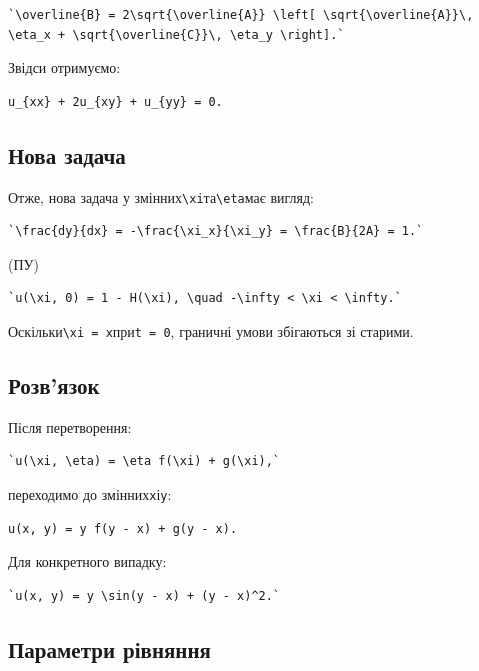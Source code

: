 \documentclass[
  ukrainian,
]{article}
\begin{document}
\begin{verbatim}
`\overline{B} = 2\sqrt{\overline{A}} \left[ \sqrt{\overline{A}}\, \eta_x + \sqrt{\overline{C}}\, \eta_y \right].`
\end{verbatim}

Звідси отримуємо:

\begin{verbatim}
u_{xx} + 2u_{xy} + u_{yy} = 0.
\end{verbatim}

\subsection{Нова
задача}\label{ux43dux43eux432ux430-ux437ux430ux434ux430ux447ux430}

Отже, нова задача у
змінних\texttt{\textbackslash{}xi}та\texttt{\textbackslash{}eta}має
вигляд:

\begin{verbatim}
`\frac{dy}{dx} = -\frac{\xi_x}{\xi_y} = \frac{B}{2A} = 1.`
\end{verbatim}

(ПУ)

\begin{verbatim}
`u(\xi, 0) = 1 - H(\xi), \quad -\infty < \xi < \infty.`
\end{verbatim}

Оскільки\texttt{\textbackslash{}xi\ =\ x}при\texttt{t\ =\ 0}, граничні
умови збігаються зі старими.

\subsection{Розв'язок}\label{ux440ux43eux437ux432ux44fux437ux43eux43a}

Після перетворення:

\begin{verbatim}
`u(\xi, \eta) = \eta f(\xi) + g(\xi),`
\end{verbatim}

переходимо до змінних\texttt{x}і\texttt{y}:

\begin{verbatim}
u(x, y) = y f(y - x) + g(y - x).
\end{verbatim}

Для конкретного випадку:

\begin{verbatim}
`u(x, y) = y \sin(y - x) + (y - x)^2.`
\end{verbatim}

\subsection{Параметри
рівняння}\label{ux43fux430ux440ux430ux43cux435ux442ux440ux438-ux440ux456ux432ux43dux44fux43dux43dux44f}
\end{document}
